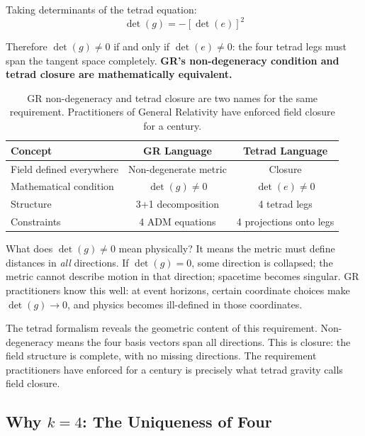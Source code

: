 \documentclass[aps,prd,preprint,superscriptaddress,showpacs,preprintnumbers,amsmath,amssymb,nofootinbib]{revtex4-2}
\begin{document}
Taking determinants of the tetrad equation:
\begin{equation}
\det(g) = -[\det(e)]^2
\label{eq:det-relation}
\end{equation}

Therefore $\det(g) \neq 0$ if and only if $\det(e) \neq 0$: the four tetrad legs must span the tangent space completely. \textbf{GR's non-degeneracy condition and tetrad closure are mathematically equivalent.}

\begin{table}[H]
\centering
\begin{tabular*}{0.95\textwidth}{@{\extracolsep{\fill}} lcc @{}}
\toprule
\textbf{Concept} & \textbf{GR Language} & \textbf{Tetrad Language} \\
\midrule
Field defined everywhere & Non-degenerate metric & Closure \\
Mathematical condition & $\det(g) \neq 0$ & $\det(e) \neq 0$ \\
Structure & 3+1 decomposition & 4 tetrad legs \\
Constraints & 4 ADM equations & 4 projections onto legs \\
\bottomrule
\end{tabular*}
\caption{GR non-degeneracy and tetrad closure are two names for the same requirement. Practitioners of General Relativity have enforced field closure for a century.}
\label{tab:closure}
\end{table}

What does $\det(g) \neq 0$ mean physically? It means the metric must define distances in \emph{all} directions. If $\det(g) = 0$, some direction is collapsed; the metric cannot describe motion in that direction; spacetime becomes singular. GR practitioners know this well: at event horizons, certain coordinate choices make $\det(g) \to 0$, and physics becomes ill-defined in those coordinates.

The tetrad formalism reveals the geometric content of this requirement. Non-degeneracy means the four basis vectors span all directions. This is closure: the field structure is complete, with no missing directions. The requirement practitioners have enforced for a century is precisely what tetrad gravity calls field closure.

\subsection{Why $k=4$: The Uniqueness of Four}
\label{subsec:k4}
\end{document}
